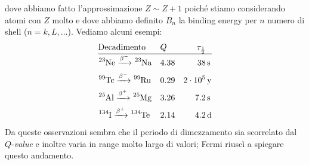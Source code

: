 dove abbiamo fatto l'approssimazione $Z\sim Z+1$ poiché stiamo considerando atomi con $Z$ molto  e dove abbiamo definito $B_n$ la binding energy per $n$ numero di shell ($n = k,L,\dots$). Vediamo alcuni esempi:
\begin{displaymath}
\begin{aligned}
&\text{Decadimento} & &Q & \tau_{\frac{1}{2}}& \\
\hline
&\ce{^{23}Ne} \betamin \ce{^{23}Na} & &4.38 & 38&\,\mbox{s} \\
&\ce{^{99}Tc} \betamin \ce{^{99}Ru} & &0.29 & 2\cdot 10^5&\,\mbox{y} \\
&\ce{^{25}Al} \betaplu \ce{^{25}Mg} & &3.26 & 7.2&\,\mbox{s} \\
&\ce{^{134}I} \betaplu \ce{^{134}Te} & &2.14 & 4.2&\,\mbox{d} \\
\end{aligned}
\end{displaymath}
Da queste osservazioni sembra che il periodo di dimezzamento sia scorrelato dal $Q$-\textit{value} e inoltre varia in range molto largo di valori; Fermi riuscì a spiegare questo andamento.